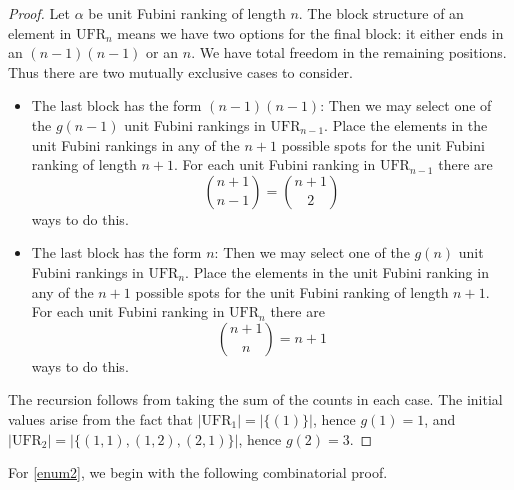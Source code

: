 \documentclass[11pt,reqno]{amsart}
\newcommand{\ufr}[1]{\mathrm{UFR}_{#1}}
\begin{document}
\begin{proof}
    Let $\alpha$ be unit Fubini ranking of length $n$. 
    The block structure of an element in $\ufr{n}$ means we have two options for the final block: it either ends in an $(n-1)(n-1)$ or an $n$. We have total freedom in the remaining positions. Thus there are two mutually exclusive cases to  consider.
    \begin{itemize}
        \item The last block has the form  $(n-1)(n-1)$: Then we may select one of the $g(n-1)$ unit Fubini rankings in $\ufr{n-1}$. Place the elements in the unit Fubini rankings in any of the $n+1$ possible spots for the unit Fubini ranking of length $n+1$. For each unit Fubini ranking in $\ufr{n-1}$ there are 
        \[
        \binom{n+1}{n-1} = \binom{n+1}{2}
        \]
        ways to do this.
        \item The last block has the form $n$: Then we may select one of the $g(n)$ unit Fubini rankings in $\ufr{n}$. Place the elements in the unit Fubini ranking in any of the $n+1$ possible spots for the unit Fubini ranking of length $n+1$. For each unit Fubini ranking in $\ufr{n}$ there are \[\binom{n+1}{n} = n+1\] ways to do this.
    \end{itemize}
    The recursion follows from taking the sum of the counts in each case. The initial values arise from the fact that $|\ufr{1}|=|\{(1)\}|$, hence $g(1)=1$, and $|\ufr{2}|=|\{(1,1),(1,2),(2,1)\}|$, hence $g(2)=3$.    
\end{proof}

For \eqref{enum2}, we begin with the following combinatorial proof.

\newFormulaThm*
\end{document}
